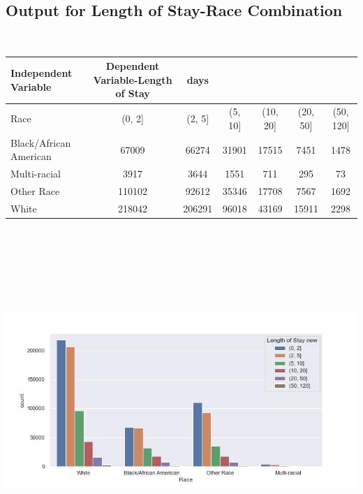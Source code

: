 \documentclass[
	letterpaper, %
]{jdf}
\begin{document}
\subsection{Output for Length of Stay-Race Combination}
\ 
\begin{jdftable}
\label{table:Example}
\small %
\begin{tabular}{@{} l c c c c c c}
\textbf{Independent Variable} & \textbf{Dependent Variable-Length of Stay} &\textbf{days} & & & \\
	\toprule[0.5pt]
Race & (0, 2] & (2, 5] & (5, 10] & (10, 20] & (20, 50] & (50, 120] \\ 
\midrule
Black/African American & 67009 & 66274 & 31901 & 17515 & 7451 & 1478 \\
\midrule
Multi-racial & 3917 & 3644 & 1551 & 711 & 295 & 73 \\
\midrule
Other Race & 110102 & 92612 & 35346 & 17708 & 7567 & 1692 \\
\midrule
White & 218042 & 206291 & 96018 & 43169 & 15911 & 2298 \\
\end{tabular}
\end{jdftable}
\begin{jdffigure}
\includegraphics[height=13cm]{Figures/length-race.jpg} \\
\label{fig:length-race}%
\end{jdffigure}
\end{document}
